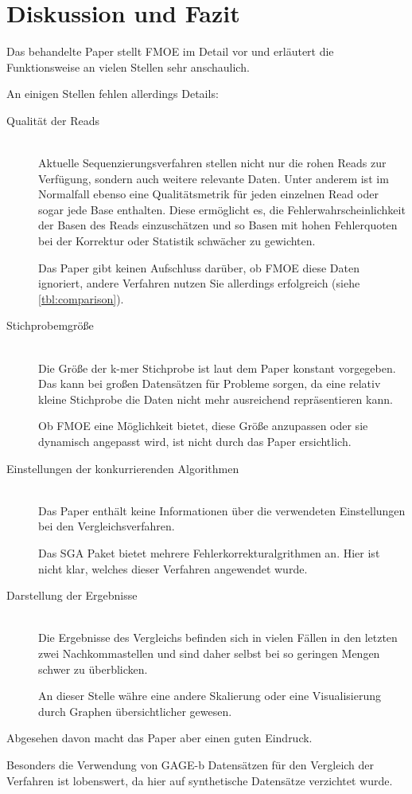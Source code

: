 \chapter{Diskussion und Fazit}
\label{ch:diskussion}

Das behandelte Paper stellt FMOE im Detail vor und erläutert die Funktionsweise an vielen Stellen sehr anschaulich.

An einigen Stellen fehlen allerdings Details:
\begin{description}
	\item[Qualität der Reads]\hfill\\
		Aktuelle Sequenzierungsverfahren stellen nicht nur die rohen Reads zur Verfügung, sondern auch weitere relevante Daten.
		Unter anderem ist im Normalfall ebenso eine Qualitätsmetrik für jeden einzelnen Read oder sogar jede Base enthalten.
		Diese ermöglicht es, die Fehlerwahrscheinlichkeit der Basen des Reads einzuschätzen und so Basen mit hohen Fehlerquoten bei der Korrektur oder Statistik schwächer zu gewichten.

		Das Paper gibt keinen Aufschluss darüber, ob FMOE diese Daten ignoriert, andere Verfahren nutzen Sie allerdings erfolgreich (siehe \ref{tbl:comparison}).

	\item[Stichprobemgröße]\hfill\\
		Die Größe der k-mer Stichprobe ist laut dem Paper konstant vorgegeben.
		Das kann bei großen Datensätzen für Probleme sorgen, da eine relativ kleine Stichprobe die Daten nicht mehr ausreichend repräsentieren kann.

		Ob FMOE eine Möglichkeit bietet, diese Größe anzupassen oder sie dynamisch angepasst wird, ist nicht durch das Paper ersichtlich.
	
	\item[Einstellungen der konkurrierenden Algorithmen]\hfill\\
		Das Paper enthält keine Informationen über die verwendeten Einstellungen bei den Vergleichsverfahren.

		Das SGA Paket bietet mehrere Fehlerkorrekturalgrithmen an.
		Hier ist nicht klar, welches dieser Verfahren angewendet wurde.

	\item[Darstellung der Ergebnisse]\hfill\\
		Die Ergebnisse des Vergleichs befinden sich in vielen Fällen in den letzten zwei Nachkommastellen und sind daher selbst bei so geringen Mengen schwer zu überblicken.

		An dieser Stelle währe eine andere Skalierung oder eine Visualisierung durch Graphen übersichtlicher gewesen.
\end{description}

Abgesehen davon macht das Paper aber einen guten Eindruck.

Besonders die Verwendung von GAGE-b Datensätzen für den Vergleich der Verfahren ist lobenswert, da hier auf synthetische Datensätze verzichtet wurde.
